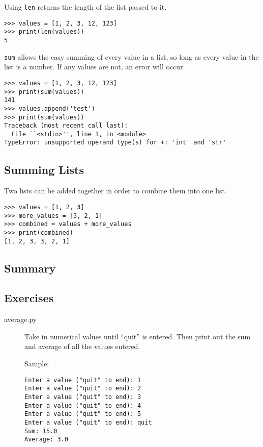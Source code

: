 \documentclass[11pt]{cselabheader}
\begin{document}
Using \lstinline{len} returns the length of the list passed to it.

\begin{lstlisting}[style=ipython]
>>> values = [1, 2, 3, 12, 123]
>>> print(len(values))
5
\end{lstlisting}

\lstinline{sum} allows the easy summing of every value in a list, so long as every value in the list is a number. If any values are not, an error will occur.

\begin{lstlisting}[style=ipython]
>>> values = [1, 2, 3, 12, 123]
>>> print(sum(values))
141
>>> values.append('test')
>>> print(sum(values))
Traceback (most recent call last):
  File ``<stdin>'', line 1, in <module>
TypeError: unsupported operand type(s) for +: 'int' and 'str'
\end{lstlisting}

\subsection{Summing Lists}
Two lists can be added together in order to combine them into one list.

\begin{lstlisting}[style=ipython]
>>> values = [1, 2, 3]
>>> more_values = [3, 2, 1]
>>> combined = values + more_values
>>> print(combined)
[1, 2, 3, 3, 2, 1]
\end{lstlisting}


\subsection{Summary}


\subsection{Exercises}
\label{subsec:listsex}

\begin{description}
  \item[average.py] Take in numerical values until ``quit'' is entered. Then print out the sum and average of all the values entered.

    Sample:
    \begin{lstlisting}[style=ipython]
Enter a value ("quit" to end): 1
Enter a value ("quit" to end): 2
Enter a value ("quit" to end): 3
Enter a value ("quit" to end): 4
Enter a value ("quit" to end): 5
Enter a value ("quit" to end): quit
Sum: 15.0
Average: 3.0
    \end{lstlisting}
\end{description}
\end{document}
